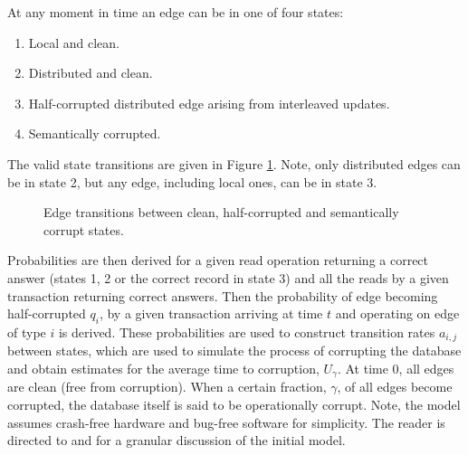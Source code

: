 \documentclass[sigplan,10pt]{acmart}
\begin{document}
At any moment in time an edge can be in one of four states:
\begin{enumerate}
\item Local and clean.
\item Distributed and clean.
\item Half-corrupted distributed edge arising from interleaved updates.
\item Semantically corrupted.
\end{enumerate}
The valid state transitions are given in Figure \ref{state-transitions}. Note, only distributed edges can be in state 2, but any edge, including local ones, can be in state 3.

\begin{figure}[ht]
  \centering
    \caption{Edge transitions between clean, half-corrupted and semantically corrupt states.}
    \label{state-transitions}
\end{figure}

Probabilities are then derived for a given read operation returning a correct answer (states 1, 2 or the correct record in state 3) and all the reads by a given transaction returning correct answers. Then the probability of edge becoming half-corrupted $q_i$, by a given transaction arriving at time $t$ and operating on edge of type $i$ is derived. These probabilities are used to construct transition rates $a_{i,j}$ between states, which are used to simulate the process of corrupting the database and obtain estimates for the average time to corruption, $U_{\gamma}$. At time $0$, all edges are clean (free from corruption). When a certain fraction, $\gamma$, of all edges become corrupted, the database itself is said to be operationally corrupt.  Note, the model assumes crash-free hardware and bug-free software for simplicity. The reader is directed to \cite{Ezhilchelvan2018} and \cite{Webber2019} for a granular discussion of the initial model.
\end{document}
